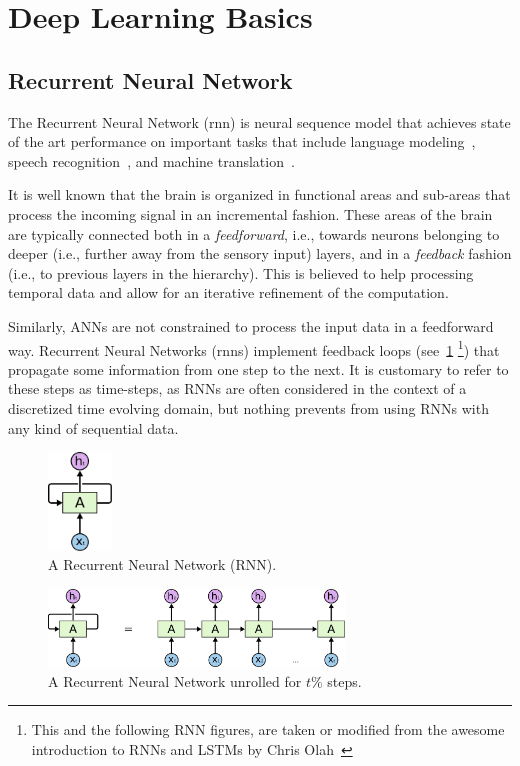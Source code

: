 \section{Deep Learning Basics}
\subsection{Recurrent Neural Network} 
The Recurrent Neural Network (\gls{rnn}) is neural sequence model that achieves state of the art performance on important tasks that include language modeling~\cite{mikolov_12}, speech recognition~\cite{graves_13}, and machine translation~\cite{kal_13}.  

It is well known that the brain is organized in functional areas and sub-areas that process the incoming signal in an incremental fashion. These areas of the brain are typically connected both in a \emph{feedforward}, i.e., towards
neurons belonging to deeper (i.e., further away from the sensory input) layers, and in a \emph{feedback} fashion (i.e., to previous layers in the hierarchy). This is believed to help processing temporal data and allow for an iterative refinement of the computation.

Similarly, ANNs are not constrained to process the input data in a feedforward way. Recurrent Neural Networks (\gls{rnn}s) implement feedback loops (see~\ref{fig:RNN_loop} \footnote{This and the following RNN figures, are taken or modified from the awesome introduction to RNNs and LSTMs by Chris Olah~\cite{colah_15}}) that propagate some information from one step to the next. It is customary to refer to these steps as time-steps, as RNNs are often considered in the context of a discretized time evolving domain, but nothing prevents from using RNNs with any kind of sequential data.

\begin{figure}[t]
	\centering
	\includegraphics[width=0.15\textwidth]{figures/RNN_loop.pdf}
	\caption{A Recurrent Neural Network (RNN).\label{fig:RNN_loop}}
\end{figure}

\begin{figure}[t!]
	\centering
	\includegraphics[width=0.7\textwidth]{figures/RNN_unrolled.pdf}
	\caption{A Recurrent Neural Network unrolled for $t$\% steps.\label{fig:RNN_unrolled}}
\end{figure}

